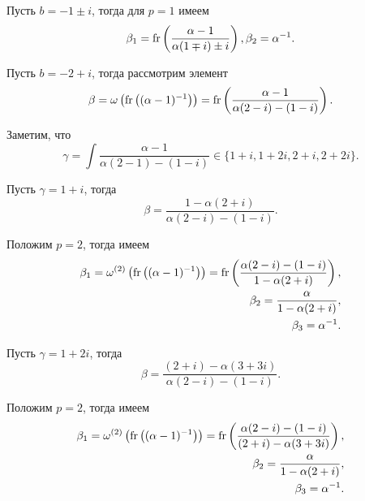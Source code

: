 \documentclass[_00_dissertation.tex]{subfiles}
\begin{document}
\begin{example}
    Пусть $b = -1 \pm i$, тогда для $p = 1$ имеем
    \begin{equation*}
        \beta_1 = \textrm{fr}\left(\frac{\alpha - 1}{\alpha(1 \mp i) \pm i}\right), \beta_2 = \alpha^{-1}.
    \end{equation*}

    Пусть $b = -2 + i$, тогда рассмотрим элемент
    \begin{equation*}
        \beta = \omega\left(
            \textrm{fr}\left((\alpha - 1)^{-1}\right)
        \right) = \textrm{fr}\left(\frac{\alpha - 1}{\alpha(2 - i) - (1 - i)}\right).
    \end{equation*}

    Заметим, что
    \begin{equation*}
        \gamma = \int{\frac{\alpha - 1}{\alpha(2 - 1) - (1 - i)}} \in \{1 + i, 1 + 2i, 2 + i, 2 + 2i\}.
    \end{equation*}

    Пусть $\gamma = 1 + i$, тогда
    \begin{equation*}
        \beta = \frac{1 - \alpha(2 + i)}{\alpha(2 - i) - (1 - i)}.
    \end{equation*}

    Положим $p = 2$, тогда имеем
    \begin{equation*}
        \begin{split}
            \beta_1 = \omega^{(2)}\left(
                \textrm{fr}\left((\alpha-1)^{-1}\right)
            \right) = \textrm{fr}\left(\frac{\alpha(2-i)-(1-i)}{1-\alpha(2+i)}\right),\\
            \beta_2 = \frac{\alpha}{1-\alpha(2+i)},\\
            \beta_3 = \alpha^{-1}.
        \end{split}
    \end{equation*}

    Пусть $\gamma = 1 + 2i$, тогда
    \begin{equation*}
        \beta = \frac{(2 + i) - \alpha(3 + 3i)}{\alpha(2 - i) - (1 - i)}.
    \end{equation*}

    Положим $p = 2$, тогда имеем
    \begin{equation*}
        \begin{split}
            \beta_1 = \omega^{(2)}\left(
                \textrm{fr}\left((\alpha-1)^{-1}\right)
            \right) = \textrm{fr}\left(\frac{\alpha(2 - i) - (1 - i)}{(2 + i) - \alpha(3 + 3i)}\right),\\
            \beta_2 = \frac{\alpha}{1 - \alpha(2 + i)},\\
            \beta_3 = \alpha^{-1}.
        \end{split}
    \end{equation*}


\end{example}
\end{document}
